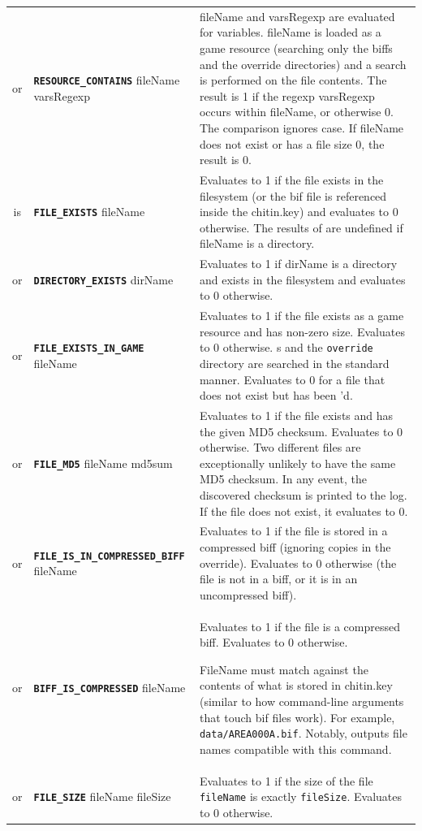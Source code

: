 \documentclass{article}
\def\ttref#1{\ahrefloc{#1}{\tt #1}}
\def\DEFINE#1{{\tt \bf #1}\label{#1}\index{#1}}
\def\t#1{{\tt #1}}
\begin{document}
\begin{tabular}{cp{10in}|p{10in}}
or & \DEFINE{RESOURCE_CONTAINS} fileName varsRegexp &

fileName and varsRegexp are evaluated for variables. fileName is
loaded as a game resource (searching only the biffs and the override
directories) and a \ttref{regexp} search is performed on the file
contents. The result is 1 if the regexp varsRegexp occurs within
fileName, or otherwise 0. The comparison ignores case. If fileName
does not exist or has a file size 0, the result is 0. \\

is & \DEFINE{FILE_EXISTS} fileName & Evaluates to 1 if the file exists in the
filesystem (or the bif file is referenced inside
the chitin.key) and evaluates to 0 otherwise.
The results of \ttref{FILE_EXISTS} are undefined if fileName is a directory.
\\
or & \DEFINE{DIRECTORY_EXISTS} dirName & Evaluates to 1 if dirName is a
directory and exists in the filesystem and evaluates to 0 otherwise.
\\
or & \DEFINE{FILE_EXISTS_IN_GAME} fileName & Evaluates to 1 if the file
exists as a game resource and has non-zero size. Evaluates to 0 otherwise.
\ttref{BIFF}s and the \t{override} directory are searched in the standard
manner. Evaluates to 0 for a file that does not exist but has been
\ttref{ALLOW_MISSING}'d.\\
or & \DEFINE{FILE_MD5} fileName md5sum & Evaluates to 1 if the file exists
and has the given MD5 checksum. Evaluates to 0 otherwise. Two different
files are exceptionally unlikely to have the same MD5 checksum. In any
event, the discovered checksum is printed to the log. If the file does not
exist, it evaluates to 0. \\
or & \DEFINE{FILE_IS_IN_COMPRESSED_BIFF} fileName & Evaluates to 1 if the file
is stored in a compressed biff (ignoring copies in the override). Evaluates to
0 otherwise (the file is not in a biff, or it is in an uncompressed biff).
\\
or & \DEFINE{BIFF_IS_COMPRESSED} fileName & Evaluates to 1 if the file
is a compressed biff. Evaluates to 0 otherwise.

FileName must match against the contents of what is stored in chitin.key
(similar to how command-line arguments that touch bif files work). For
example, \verb+data/AREA000A.bif+. Notably, \ttref{SOURCE_BIFF} outputs
file names compatible with this command.
\\
or & \DEFINE{FILE_SIZE} fileName fileSize & Evaluates to 1 if the
size of the file \t{fileName} is exactly \t{fileSize}. Evaluates to 0
otherwise. \\


\end{tabular}
\end{document}
